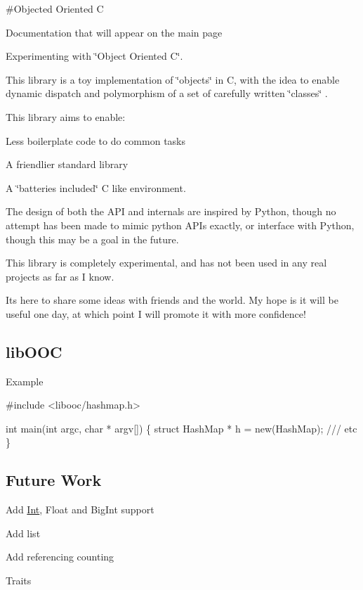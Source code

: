 \#\+Objected Oriented C

Documentation that will appear on the main page

Experimenting with \char`\"{}\+Object Oriented C\char`\"{}.

This library is a toy implementation of \char`\"{}objects\char`\"{} in C, with the idea to enable dynamic dispatch and polymorphism of a set of carefully written \char`\"{}classes\char`\"{} .

This library aims to enable\+:
\begin{DoxyItemize}
\item Less boilerplate code to do common tasks
\item A friendlier standard library
\item A \char`\"{}batteries included\char`\"{} C like environment.
\end{DoxyItemize}

The design of both the A\+PI and internals are inspired by Python, though no attempt has been made to mimic python A\+P\+Is exactly, or interface with Python, though this may be a goal in the future.

This library is completely experimental, and has not been used in any real projects as far as I know.

It\textquotesingle{}s here to share some ideas with friends and the world. My hope is it will be useful one day, at which point I will promote it with more confidence!

\subsection*{lib\+O\+OC}

Example 
\begin{DoxyCode}
#include <libooc/hashmap.h>

int main(int argc, char * argv[]) \{
    struct HashMap * h = new(HashMap);
    /// etc
\}
\end{DoxyCode}


\subsection*{Future Work}


\begin{DoxyItemize}
\item Add \mbox{\hyperlink{structInt}{Int}}, Float and Big\+Int support
\item Add list
\item Add referencing counting
\item Traits 
\end{DoxyItemize}
